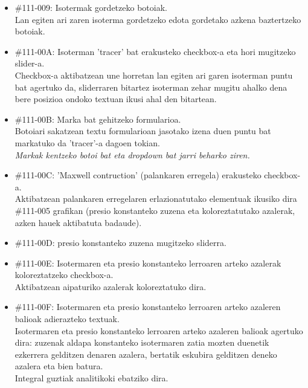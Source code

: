 \documentclass[10pt,a4paper]{article}
\let\nf\normalfont %
\newcommand{\cf}{\normalfont\sffamily}
\begin{document}
\begin{itemize}
\item \cf \#111-009: Isotermak gordetzeko botoiak.
\\
\nf Lan egiten ari zaren isoterma gordetzeko edota gordetako azkena baztertzeko botoiak.

\item \cf \#111-00A: Isoterman 'tracer' bat erakusteko checkbox-a eta hori mugitzeko slider-a.
\\
\nf Checkbox-a aktibatzean une horretan lan egiten ari garen isoterman puntu bat agertuko da, sliderraren bitartez isoterman zehar mugitu ahalko dena bere posizioa ondoko textuan ikusi ahal den bitartean.

\item \cf \#111-00B: Marka bat gehitzeko formularioa.
\\
\nf Botoiari sakatzean textu formularioan jasotako izena duen puntu bat markatuko da 'tracer'-a dagoen tokian.
\\

\textit{Markak kentzeko botoi bat eta dropdown bat jarri beharko ziren.}

\item \cf \#111-00C: 'Maxwell contruction' (palankaren erregela) erakusteko checkbox-a.
\\
\nf Aktibatzean palankaren erregelaren erlazionatutako elementuak ikusiko dira \cf \#111-005 \nf grafikan (presio konstanteko zuzena eta koloreztatutako azalerak, azken hauek aktibatuta badaude).

\item \cf \#111-00D: presio konstanteko zuzena mugitzeko sliderra.
\\
\nf

\item \cf \#111-00E: Isotermaren eta presio konstanteko lerroaren arteko azalerak koloreztatzeko checkbox-a.
\\
\nf Aktibatzean aipaturiko azalerak koloreztatuko dira.

\item \cf \#111-00F: Isotermaren eta presio konstanteko lerroaren arteko azaleren balioak adierazteko textuak.
\\
\nf Isotermaren eta presio konstanteko lerroaren arteko azaleren balioak agertuko dira: zuzenak aldapa konstanteko isotermaren zatia mozten duenetik ezkerrera gelditzen denaren azalera, bertatik eskubira gelditzen deneko azalera eta bien batura.
\\

Integral guztiak analitikoki ebatziko dira.
\\


\end{itemize}
\end{document}
